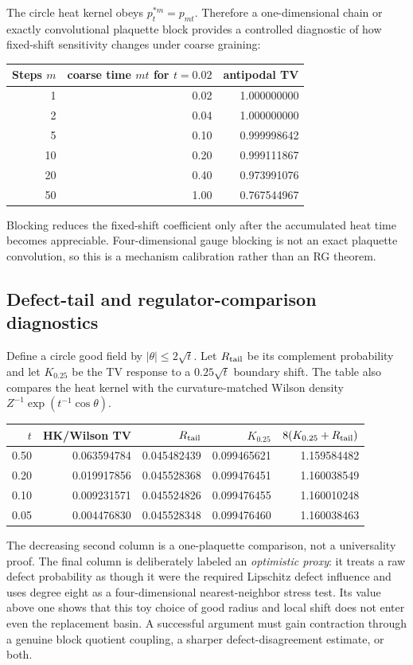 \documentclass[11pt]{article}
\theoremstyle{remark}
\begin{document}
The circle heat kernel obeys $p_t^{*m}=p_{mt}$.  Therefore a one-dimensional
chain or exactly convolutional plaquette block provides a controlled diagnostic
of how fixed-shift sensitivity changes under coarse graining:
\begin{center}
\begin{tabular}{rrr}
\toprule
Steps $m$ & coarse time $mt$ for $t=0.02$ & antipodal TV\\
\midrule
1 & 0.02 & 1.000000000\\
2 & 0.04 & 1.000000000\\
5 & 0.10 & 0.999998642\\
10 & 0.20 & 0.999111867\\
20 & 0.40 & 0.973991076\\
50 & 1.00 & 0.767544967\\
\bottomrule
\end{tabular}
\end{center}
Blocking reduces the fixed-shift coefficient only after the accumulated heat
time becomes appreciable.  Four-dimensional gauge blocking is not an exact
plaquette convolution, so this is a mechanism calibration rather than an RG
theorem.

\subsection{Defect-tail and regulator-comparison diagnostics}

Define a circle good field by $|\theta|\le2\sqrt t$.  Let $R_{\rm tail}$ be its
complement probability and let $K_{0.25}$ be the TV response to a
$0.25\sqrt t$ boundary shift.  The table also compares the heat kernel with the
curvature-matched Wilson density $Z^{-1}\exp(t^{-1}\cos\theta)$.
\begin{center}
\small
\begin{tabular}{rrrrr}
\toprule
$t$ & HK/Wilson TV & $R_{\rm tail}$ & $K_{0.25}$ & $8(K_{0.25}+R_{\rm tail})$\\
\midrule
0.50 & 0.063594784 & 0.045482439 & 0.099465621 & 1.159584482\\
0.20 & 0.019917856 & 0.045528368 & 0.099476451 & 1.160038549\\
0.10 & 0.009231571 & 0.045524826 & 0.099476455 & 1.160010248\\
0.05 & 0.004476830 & 0.045528348 & 0.099476460 & 1.160038463\\
\bottomrule
\end{tabular}
\end{center}
The decreasing second column is a one-plaquette comparison, not a universality
proof.  The final column is deliberately labeled an \emph{optimistic proxy}:
it treats a raw defect probability as though it were the required Lipschitz
defect influence and uses degree eight as a four-dimensional nearest-neighbor
stress test.  Its value above one shows that this toy choice of good radius and
local shift does not enter even the replacement basin.  A successful argument
must gain contraction through a genuine block quotient coupling, a sharper
defect-disagreement estimate, or both.
\end{document}
